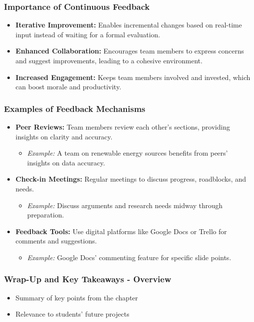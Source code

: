 \documentclass[aspectratio=169]{beamer}
\begin{document}
\begin{frame}[fragile]
    \frametitle{Importance of Continuous Feedback}
    \begin{itemize}
        \item \textbf{Iterative Improvement:} Enables incremental changes based on real-time input instead of waiting for a formal evaluation.
        \item \textbf{Enhanced Collaboration:} Encourages team members to express concerns and suggest improvements, leading to a cohesive environment.
        \item \textbf{Increased Engagement:} Keeps team members involved and invested, which can boost morale and productivity.
    \end{itemize}
\end{frame}

\begin{frame}[fragile]
    \frametitle{Examples of Feedback Mechanisms}
    \begin{itemize}
        \item \textbf{Peer Reviews:} Team members review each other’s sections, providing insights on clarity and accuracy.
        \begin{itemize}
            \item \textit{Example:} A team on renewable energy sources benefits from peers’ insights on data accuracy.
        \end{itemize}

        \item \textbf{Check-in Meetings:} Regular meetings to discuss progress, roadblocks, and needs.
        \begin{itemize}
            \item \textit{Example:} Discuss arguments and research needs midway through preparation.
        \end{itemize}

        \item \textbf{Feedback Tools:} Use digital platforms like Google Docs or Trello for comments and suggestions.
        \begin{itemize}
            \item \textit{Example:} Google Docs' commenting feature for specific slide points.
        \end{itemize}
    \end{itemize}
\end{frame}

\begin{frame}[fragile]
    \frametitle{Wrap-Up and Key Takeaways - Overview}
    \begin{itemize}
        \item Summary of key points from the chapter
        \item Relevance to students' future projects
    \end{itemize}
\end{frame}
\end{document}
